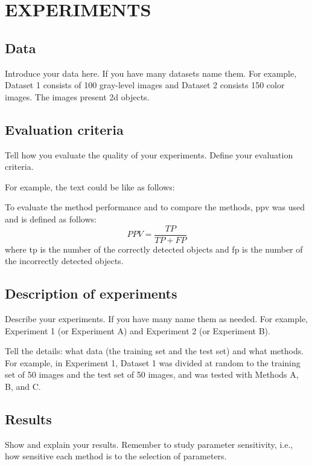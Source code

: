 \documentclass{lutmscthesis}[2017/10/03]
\begin{document}
\section{EXPERIMENTS}
\label{sec:experiments}

\subsection{Data}

Introduce your data here. If you have many datasets name them. For example, Dataset 1 consists of 100 gray-level images and Dataset 2 consists 150 color images. The images present \gls{2d} objects.  

\subsection{Evaluation criteria}

Tell how you evaluate the quality of your experiments. Define your evaluation criteria. 

For example, the text could be like as follows:

To evaluate the method performance and to compare the methods, 
\gls{ppv} was used and is defined as follows:
\begin{equation}
PPV = \frac{TP}{TP+FP}
\end{equation}
where \gls{tp} is the number of the correctly detected objects and 
\gls{fp} is the number of the incorrectly detected objects.
 
\subsection{Description of experiments}

Describe your experiments. If you have many name them as needed. For example, Experiment 1 (or Experiment A) and Experiment 2 (or Experiment B). 

Tell the details: what data (the training set and the test set) and what methods. For example, in Experiment 1, Dataset 1 was divided at random to the training set of 50 images and the test set of 50 images, and was tested with Methods A, B, and C. 

\subsection{Results}

Show and explain your results. Remember to study parameter sensitivity, i.e., how sensitive each method is to the selection of parameters. 
\end{document}
